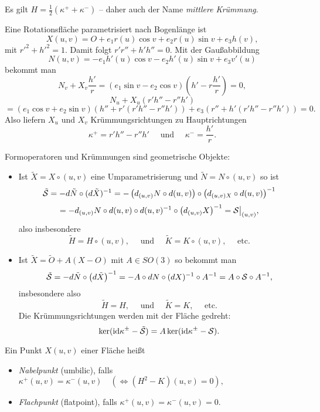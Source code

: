 \begin{remark} Es gilt
	$H=\frac 12 (\kappa^+ +\kappa^-)$ -- daher auch der Name \emph{mittlere Krümmung}.
\end{remark}

\begin{example}
	Eine Rotationsfläche parametrisiert nach Bogenlänge ist
	\[ X(u,v)= O+e_1r(u)\cos v +e_2 r(u) \sin v + e_3h(v), \]
	mit $r'^2+h'^2=1$. Damit folgt $r'r''+h'h''=0$. Mit der Gaußabbildung
	\[ N(u,v)= -e_1h'(u)\cos v - e_2h'(u) \sin v + e_3v'(u) \]
	bekommt man
	\[ N_v + X_v\frac {h'}r = (e_1\sin v - e_2\cos v)\left( h' - r\frac {h'}r \right)=0, \]
	\[ N_u + X_u\left( r'h''-r''h' \right)\]
	\[= (e_1 \cos v +e_2\sin v ) \left( h''+r'(r'h''-r''h') \right) + e_3 (r''+h'(r'h''-r''h'))
	= 0. \]
	Also liefern $X_u$ und $X_v$ Krümmungsrichtungen zu Hauptrichtungen
	\[ \kappa^+ = r'h''-r''h' \quad \text{ und }\quad
	\kappa^- = \frac {h'}r. \]		
\end{example}


\begin{remark}
	Formoperatoren und Krümmungen sind geometrische Objekte:
	\begin{itemize}
		\item Ist $\tilde X = X \circ (u,v)$ eine Umparametrisierung und $\tilde N = N \circ (u,v)$ so ist 
		\[ \tilde{\mathcal S} = -d\tilde N \circ (d\tilde X)^{-1} = -\left( d_{(u,v)}N \circ d(u,v) \right) \circ \left( d_{(u,v)X} \circ d(u,v)  \right)^{-1} \]
		\[ = -d_{(u,v)}N \circ d(u,v) \circ d(u,v)^{-1} \circ \left( d_{(u,v)}X \right)^{-1}
		= \mathcal S\big |_{(u,v)}, \]
		also insbesondere
		\[ \tilde H = H \circ (u,v), \quad \text{ und }\quad
		\tilde K = K \circ (u,v), \quad \text{ etc.} \]
		
		\item Ist $\tilde X=\tilde O+A(X-O)$ mit $A \in SO(3)$ so bekommt man 
		\[ \tilde{\mathcal S}= -d\tilde N \circ \left( d\tilde X \right)^{-1}
		= -A\circ dN \circ (dX)^{-1} \circ A^{-1}
		= A\circ \mathcal S \circ A^{-1}, \]
		insbesondere also
		\[ \tilde H = H, \quad \text{ und }\quad
		\tilde K = K, \quad \text{ etc.} \]
		Die Krümmungsrichtungen werden mit der Fläche gedreht:
		\[ \ker (\mathrm{id} \kappa^\pm -\tilde{\mathcal S}) = A\ker (\mathrm{id} \kappa^\pm-\mathcal S). \]
	\end{itemize}
\end{remark}	
	
\begin{definition}
	
	Ein Punkt $X(u,v)$ einer Fläche heißt 
	\begin{itemize}
		
		\item \emph{Nabelpunkt} (umbilic), falls $\kappa^+(u,v) = \kappa^-(u,v) \quad (\Longleftrightarrow (H^2- K)(u,v)=0), $
		\item \emph{Flachpunkt} (flatpoint), falls $\kappa^+(u,v) = \kappa^-(u,v)=0.$
		
	\end{itemize}

	
\end{definition}

